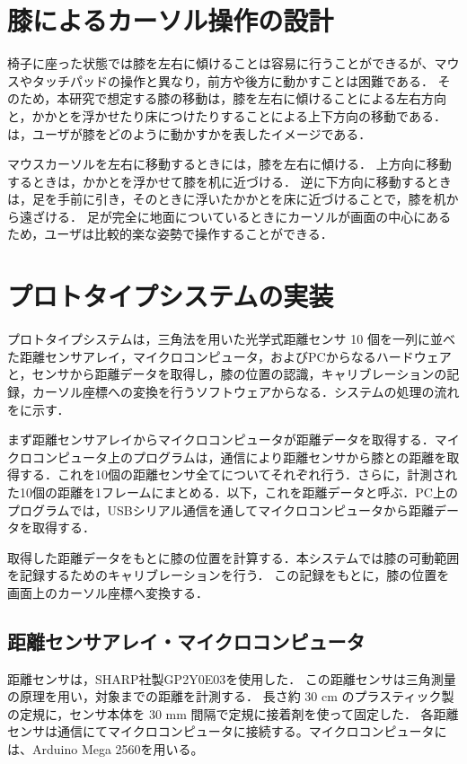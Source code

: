 \documentclass[submit, techrep]{ipsj}
\begin{document}
\section{膝によるカーソル操作の設計}
椅子に座った状態では膝を左右に傾けることは容易に行うことができるが、マウスやタッチパッドの操作と異なり，前方や後方に動かすことは困難である．
そのため，本研究で想定する膝の移動は，膝を左右に傾けることによる左右方向と，かかとを浮かせたり床につけたりすることによる上下方向の移動である．
は，ユーザが膝をどのように動かすかを表したイメージである．

マウスカーソルを左右に移動するときには，膝を左右に傾ける．
上方向に移動するときは，かかとを浮かせて膝を机に近づける．
逆に下方向に移動するときは，足を手前に引き，そのときに浮いたかかとを床に近づけることで，膝を机から遠ざける．
足が完全に地面についているときにカーソルが画面の中心にあるため，ユーザは比較的楽な姿勢で操作することができる．

\section{プロトタイプシステムの実装}
プロトタイプシステムは，三角法を用いた光学式距離センサ 10 個を一列に並べた距離センサアレイ，マイクロコンピュータ，およびPCからなるハードウェアと，センサから距離データを取得し，膝の位置の認識，キャリブレーションの記録，カーソル座標への変換を行うソフトウェアからなる．システムの処理の流れをに示す．\par
まず距離センサアレイからマイクロコンピュータが距離データを取得する．マイクロコンピュータ上のプログラムは，\iic 通信により距離センサから膝との距離を取得する．これを10個の距離センサ全てについてそれぞれ行う．さらに，計測された10個の距離を1フレームにまとめる．以下，これを距離データと呼ぶ．PC上のプログラムでは，USBシリアル通信を通してマイクロコンピュータから距離データを取得する．\par
取得した距離データをもとに膝の位置を計算する．本システムでは膝の可動範囲を記録するためのキャリブレーションを行う．
この記録をもとに，膝の位置を画面上のカーソル座標へ変換する．


\subsection{距離センサアレイ・マイクロコンピュータ}
距離センサは，SHARP社製GP2Y0E03を使用した．
この距離センサは三角測量の原理を用い，対象までの距離を計測する．
長さ約 30 \si{cm} のプラスティック製の定規に，センサ本体を 30 \si{mm} 間隔で定規に接着剤を使って固定した．
各距離センサは\iic 通信にてマイクロコンピュータに接続する。マイクロコンピュータには、Arduino Mega 2560を用いる。
\end{document}
